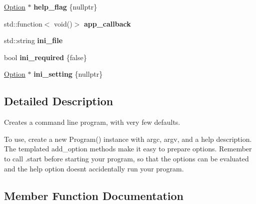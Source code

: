 \begin{DoxyCompactItemize}
\item 
\mbox{\label{class_c_l_i_1_1_app_aa098aec25a9bb797224471a8099abd8f}} 
\hyperlink{class_c_l_i_1_1_option}{Option} $\ast$ {\bfseries help\+\_\+flag} \{nullptr\}
\item 
\mbox{\label{class_c_l_i_1_1_app_a30dfed7cc8b6a83819514833464d85b5}} 
std\+::function$<$ void()$>$ {\bfseries app\+\_\+callback}
\item 
\mbox{\label{class_c_l_i_1_1_app_ace38ff83884de70e9dab64ec41df4970}} 
std\+::string {\bfseries ini\+\_\+file}
\item 
\mbox{\label{class_c_l_i_1_1_app_a2c87edf5fba90a7b49084c5f1fa305f8}} 
bool {\bfseries ini\+\_\+required} \{false\}
\item 
\mbox{\label{class_c_l_i_1_1_app_a34fefef83347fb6f922372344f613b3c}} 
\hyperlink{class_c_l_i_1_1_option}{Option} $\ast$ {\bfseries ini\+\_\+setting} \{nullptr\}
\end{DoxyCompactItemize}


\subsection{Detailed Description}
Creates a command line program, with very few defaults. 

To use, create a new {\ttfamily Program()} instance with {\ttfamily argc}, {\ttfamily argv}, and a help description. The templated add\+\_\+option methods make it easy to prepare options. Remember to call {\ttfamily .start} before starting your program, so that the options can be evaluated and the help option doesn\textquotesingle{}t accidentally run your program. 

\subsection{Member Function Documentation}
\mbox{\label{class_c_l_i_1_1_app_ad3608e288902be51227ce8549bac6743}} 
